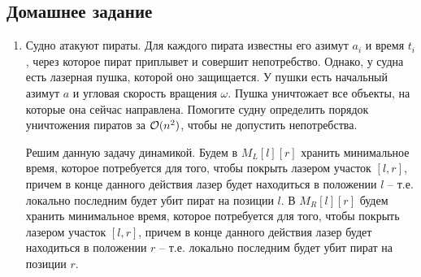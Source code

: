 \subsection{Домашнее задание}
\begin{enumerate}
  \item {}
    Судно атакуют пираты. Для каждого пирата известны его азимут $a_i$
    и время $t_i$, через которое пират приплывет и совершит
    непотребство. Однако, у судна есть лазерная пушка, которой оно
    защищается. У пушки есть начальный азимут $a$ и угловая скорость
    вращения $\omega$. Пушка уничтожает все объекты, на которые она
    сейчас направлена. Помогите судну определить порядок уничтожения
    пиратов за $\mathcal{O}(n^2)$, чтобы не допустить непотребства.
  \begin{solution}
    Решим данную задачу динамикой. Будем в $M_L[l][r]$ хранить минимальное время, которое потребуется для того, чтобы покрыть лазером участок $[l, r]$, причем в конце данного действия лазер будет находиться в положении $l$ -- т.е. локально последним будет убит пират на позиции $l$. В $M_R[l][r]$ будем хранить минимальное время, которое потребуется для того, чтобы покрыть лазером участок $[l, r]$, причем в конце данного действия лазер будет находиться в положении $r$ -- т.е. локально последним будет убит пират на позиции $r$.
    

\end{solution}
\end{enumerate}

